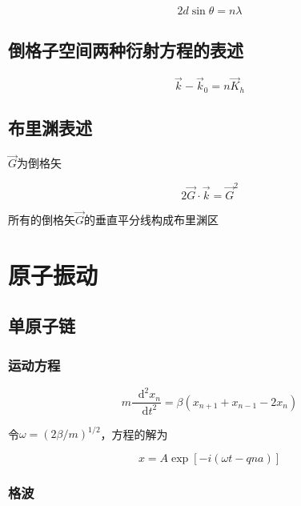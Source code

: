 \documentclass{article}
\newcommand*{\md}{\mathop{}\!\mathrm{d}}
\begin{document}
\begin{multicols}{2}
\begin{equation*}
  2d \sin \theta = n\lambda
\end{equation*}

\subsection{倒格子空间两种衍射方程的表述}

\begin{equation*}
  \vec{k} - \vec{k}_0 = n \vec{K}_h
\end{equation*}

\subsection{布里渊表述}

$\vec{G}$为倒格矢

\begin{equation*}
  2 \vec{G} \cdot \vec{k} = \vec{G}^2
\end{equation*}

所有的倒格矢$\vec{G}$的垂直平分线构成布里渊区

\section{原子振动}

\subsection{单原子链}

\subsubsection{运动方程}

\begin{equation*}
  m \dfrac{\md^2 x_n}{\md t^2} = \beta \left( x_{n+1} + x_{n-1} - 2x_n \right)
\end{equation*}

令$\omega=\left( 2\beta/m \right)^{1/2}$，方程的解为

\begin{equation*}
  x=A\exp \left[ - i \left( \omega t - qna \right) \right]
\end{equation*}

\subsubsection{格波}


\end{multicols}
\end{document}
